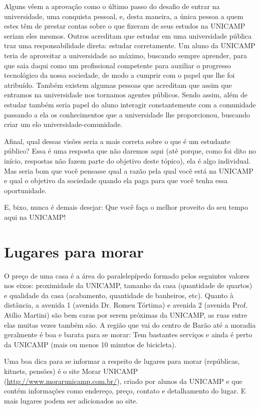 \documentclass[a4paper,10pt]{article}
\begin{document}
Alguns vêem a aprovação como o último passo do desafio de entrar na
universidade, uma conquista pessoal, e, desta maneira, a única pessoa a quem
estes têm de prestar contas sobre o que fizeram de seus estudos na UNICAMP
seriam eles mesmos. Outros acreditam que estudar em uma universidade pública
traz uma responsabilidade direta: estudar corretamente. Um aluno da UNICAMP
teria de aproveitar a universidade ao máximo, buscando sempre aprender, para que
saia daqui como um profissional competente para auxiliar o progresso tecnológico
da nossa sociedade, de modo a cumprir com o papel que lhe foi atribuído. Também
existem algumas pessoas que acreditam que assim que entramos na universidade nos
tornamos agentes públicos. Sendo assim, além de estudar também seria papel do
aluno interagir constantemente com a comunidade passando a ela os conhecimentos
que a universidade lhe proporcionou, buscando criar um elo
universidade-comunidade.

Afinal, qual dessas visões seria a mais correta sobre o que é um estudante
público? Essa é uma resposta que não daremos aqui (até porque, como foi dito no
início, respostas não fazem parte do objetivo deste tópico), ela é algo
individual. Mas seria bom que você pensasse qual a razão pela qual você está na
UNICAMP e qual o objetivo da sociedade quando ela paga para que você tenha essa
oportunidade.

E, bixo, nunca é demais desejar: Que você faça o melhor proveito do seu tempo
aqui na UNICAMP!

\section{Lugares para morar}
O preço de uma casa é a área do paralelepípedo formado pelos seguintes valores
nos eixos: proximidade da UNICAMP, tamanho da casa (quantidade de quartos)
e qualidade da casa (acabamento, quantidade de banheiros, etc). Quanto
à distância, a avenida 1 (avenida Dr. Romeu Tórtima) e avenida 2 (avenida Prof.
Atílio Martini) são bem caras por serem próximas da UNICAMP, as ruas entre elas
muitas vezes também são. A região que vai do centro de Barão até a moradia
geralmente é boa e barata para se morar: Tem bastantes serviços e ainda é perto
da UNICAMP (mais ou menos 10 minutos de bicicleta).

Uma boa dica para se informar a respeito de lugares para morar (repúblicas,
kitnets, pensões) é o site Morar UNICAMP
(\url{http://www.morarunicamp.com.br/}), criado por alunos da UNICAMP e que
contém informações como endereço, preço, contato e detalhamento do lugar. E mais
lugares podem ser adicionados ao site.
\end{document}
